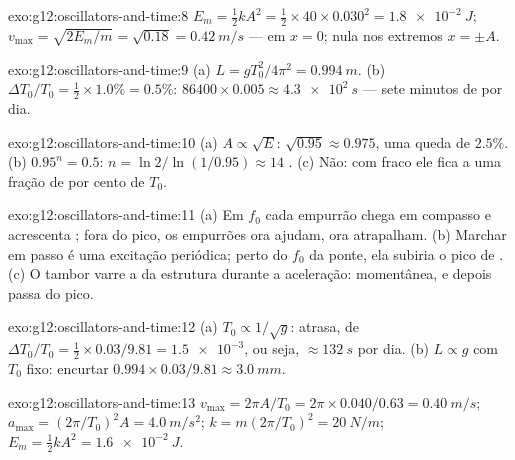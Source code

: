 \begin{solution}{exo:g12:oscillators-and-time:8}
$E_m = \tfrac12 kA^2 = \tfrac12 \times 40 \times 0.030^2 =
\qty{1.8e-2}{J}$; $v_{\max} = \sqrt{2E_m/m} = \sqrt{0.18} =
\qty{0.42}{m/s}$ --- em $x = 0$; nula nos extremos $x = \pm A$.
\end{solution}

\begin{solution}{exo:g12:oscillators-and-time:9}
(a) $L = gT_0^2/4\pi^2 = \qty{0.994}{m}$. (b)
$\Delta T_0/T_0 = \tfrac12 \times 1.0\% = 0.5\%$:
$86400 \times 0.005 \approx \qty{4.3e2}{s}$ --- sete minutos de 
por dia.
\end{solution}

\begin{solution}{exo:g12:oscillators-and-time:10}
(a) $A \propto \sqrt{E}$: $\sqrt{0.95} \approx 0.975$, uma queda de
$2.5\%$. (b) $0.95^n = 0.5$: $n = \ln 2/\ln(1/0.95) \approx 14$
. (c) Não: com  fraco ele fica a uma fração de por
cento de $T_0$.
\end{solution}

\begin{solution}{exo:g12:oscillators-and-time:11}
(a) Em $f_0$ cada empurrão chega em compasso e acrescenta ; fora
do pico, os empurrões ora ajudam, ora atrapalham. (b) Marchar em passo é
uma excitação periódica; perto do $f_0$ da ponte, ela subiria o pico de
. (c) O tambor varre a  da estrutura durante
a aceleração:  momentânea, e depois passa do pico.
\end{solution}

\begin{solution}{exo:g12:oscillators-and-time:12}
(a) $T_0 \propto 1/\sqrt{g}$: atrasa, de
$\Delta T_0/T_0 = \tfrac12 \times 0.03/9.81 = \num{1.5e-3}$, ou seja,
$\approx \qty{132}{s}$ por dia. (b) $L \propto g$ com $T_0$ fixo:
encurtar $0.994 \times 0.03/9.81 \approx \qty{3.0}{mm}$.
\end{solution}

\begin{solution}{exo:g12:oscillators-and-time:13}
$v_{\max} = 2\pi A/T_0 = 2\pi \times 0.040/0.63 = \qty{0.40}{m/s}$;
$a_{\max} = (2\pi/T_0)^2 A = \qty{4.0}{m/s^2}$;
$k = m(2\pi/T_0)^2 = \qty{20}{N/m}$;
$E_m = \tfrac12 kA^2 = \qty{1.6e-2}{J}$.
\end{solution}

